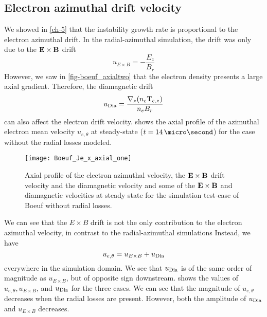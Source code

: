 
\subsection{Electron azimuthal drift velocity} \label{subsec-drift}

  We showed in \cref{ch-5} that the instability growth rate is proportional to the electron azimuthal drift.
  In the radial-azimuthal simulation, the drift was only due to the ${\mathbf E} \times {\mathbf B}$ drift
  \begin{equation} \label{eq-exbdrift}
    u_{E \times B} = - \frac{E_z}{B_r}
  \end{equation}
  However, we saw in \cref{fig-boeuf_axialtwo} that the electron density presents a large axial gradient.
  Therefore, the diamagnetic drift
  $$u_{\rm Dia}=\frac{\nabla_z (n_e {\rm T}_{e,z})}{n_e B_r}$$
  can also affect the electron drift velocity.
   shows the axial profile of the azimuthal electron mean velocity $u_{e, \theta}$ at steady-state ($t = 14\,\micro\second$) for the case without the radial losses modeled.

 
  \begin{figure}[hbt]
    \centering
    \texttt{[image: Boeuf\_Je\_x\_axial\_one]}
    \caption{Axial profile of the electron azimuthal velocity, the ${\mathbf E} \times {\mathbf B}$ drift velocity and the diamagnetic velocity and some of the ${\mathbf E} \times {\mathbf B}$ and diamagnetic velocities at steady state for the simulation test-case of Boeuf without radial losses.}
    \label{fig-Jetheta_sum}
  \end{figure}
  
  We can see that the $E \times B$ drift is not the only contribution to the electron azimuthal velocity, in contrast to the radial-azimuthal simulations
  Instead, we have 
  $$ u_{e, \theta} =   u_{E \times B} + u_{\rm Dia}$$
  everywhere in the simulation domain.
  We see that $u_{\rm Dia}$ is of the same order of magnitude as $u_{E \times B}$, but of opposite sign downstream.
   shows the values of $ u_{e, \theta},   u_{E \times B}$, and $u_{\rm Dia}$ for the three cases.
  We can see that the magnitude of $u_{e, \theta} $ decreases when the radial losses are present.
  However, both the amplitude of $u_{\rm Dia}$ and $u_{E \times B}$ decreases.

